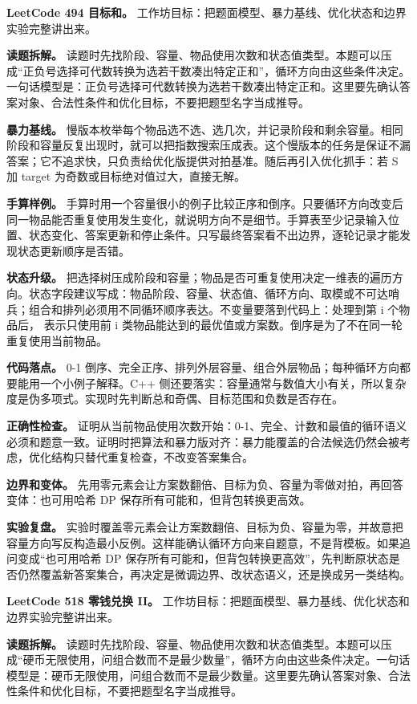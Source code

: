\noindent\textbf{LeetCode 494 目标和。} 工作坊目标：把题面模型、暴力基线、优化状态和边界实验完整讲出来。

\textbf{读题拆解。} 读题时先找阶段、容量、物品使用次数和状态值类型。本题可以压成“正负号选择可代数转换为选若干数凑出特定正和”，循环方向由这些条件决定。一句话模型是：正负号选择可代数转换为选若干数凑出特定正和。这里要先确认答案对象、合法性条件和优化目标，不要把题型名字当成推导。

\textbf{暴力基线。} 慢版本枚举每个物品选不选、选几次，并记录阶段和剩余容量。相同阶段和容量反复出现时，就可以把指数搜索压成表。这个慢版本的任务是保证不漏答案；它不追求快，只负责给优化版提供对拍基准。随后再引入优化抓手：若 S 加 target 为奇数或目标绝对值过大，直接无解。

\textbf{手算样例。} 手算时用一个容量很小的例子比较正序和倒序。只要循环方向改变后同一物品能否重复使用发生变化，就说明方向不是细节。手算表至少记录输入位置、状态变化、答案更新和停止条件。只写最终答案看不出边界，逐轮记录才能发现状态更新顺序是否错。

\textbf{状态升级。} 把选择树压成阶段和容量；物品是否可重复使用决定一维表的遍历方向。状态字段建议写成：物品阶段、容量、状态值、循环方向、取模或不可达哨兵；组合和排列必须用不同循环顺序表达。不变量要落到代码上：处理到第 i 个物品后， 表示只使用前 i 类物品能达到的最优值或方案数。倒序是为了不在同一轮重复使用当前物品。

\textbf{代码落点。} 0-1 倒序、完全正序、排列外层容量、组合外层物品；每种循环方向都要能用一个小例子解释。C++ 侧还要落实：容量通常与数值大小有关，所以复杂度是伪多项式。实现时先判断总和奇偶、目标范围和负数是否存在。

\textbf{正确性检查。} 证明从当前物品使用次数开始：0-1、完全、计数和最值的循环语义必须和题意一致。证明时把算法和暴力版对齐：暴力能覆盖的合法候选仍然会被考虑，优化结构只替代重复检查，不改变答案集合。

\textbf{边界和变体。} 先用零元素会让方案数翻倍、目标为负、容量为零做对拍，再回答变体：也可用哈希 DP 保存所有可能和，但背包转换更高效。

\textbf{实验复盘。} 实验时覆盖零元素会让方案数翻倍、目标为负、容量为零，并故意把容量方向写反构造最小反例。这样能确认循环方向来自题意，不是背模板。如果追问变成“也可用哈希 DP 保存所有可能和，但背包转换更高效”，先判断原状态是否仍然覆盖新答案集合，再决定是微调边界、改状态语义，还是换成另一类结构。

\noindent\textbf{LeetCode 518 零钱兑换 II。} 工作坊目标：把题面模型、暴力基线、优化状态和边界实验完整讲出来。

\textbf{读题拆解。} 读题时先找阶段、容量、物品使用次数和状态值类型。本题可以压成“硬币无限使用，问组合数而不是最少数量”，循环方向由这些条件决定。一句话模型是：硬币无限使用，问组合数而不是最少数量。这里要先确认答案对象、合法性条件和优化目标，不要把题型名字当成推导。


